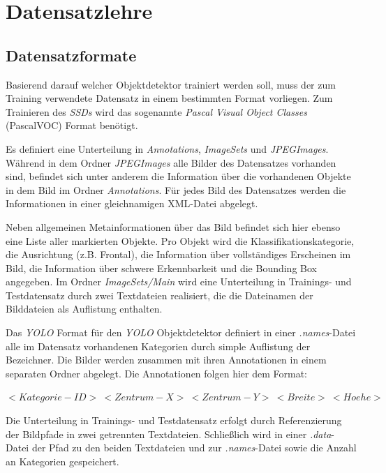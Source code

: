 \section{Datensatzlehre}

\subsection{Datensatzformate}

Basierend darauf welcher Objektdetektor trainiert werden soll, muss der zum Training verwendete Datensatz in einem bestimmten Format vorliegen. Zum Trainieren des \textit{SSDs} wird das sogenannte \textit{Pascal Visual Object Classes} (PascalVOC) Format benötigt. 

Es definiert eine Unterteilung in \textit{Annotations}, \textit{ImageSets} und \textit{JPEGImages}. Während in dem Ordner \textit{JPEGImages} alle Bilder des Datensatzes vorhanden sind, befindet sich unter anderem die Information über die vorhandenen Objekte in dem Bild im Ordner \textit{Annotations}. Für jedes Bild des Datensatzes werden die Informationen in einer gleichnamigen XML-Datei abgelegt. 

\lstset{language=XML}


Neben allgemeinen Metainformationen über das Bild befindet sich hier ebenso eine Liste aller markierten Objekte. Pro Objekt wird die Klassifikationskategorie, die Ausrichtung (z.B. \glqq Frontal\grqq{}), die Information über vollständiges Erscheinen im Bild, die Information über schwere Erkennbarkeit und die Bounding Box angegeben. Im Ordner \textit{ImageSets/Main} wird eine Unterteilung in Trainings- und Testdatensatz durch zwei Textdateien realisiert, die die Dateinamen der Bilddateien als Auflistung enthalten. \cite{RenuKhandelwal.2019}

Das \textit{YOLO} Format für den \textit{YOLO} Objektdetektor definiert in einer \textit{.names}-Datei alle im Datensatz vorhandenen Kategorien durch simple Auflistung der Bezeichner. Die Bilder werden zusammen mit ihren Annotationen in einem separaten Ordner abgelegt. Die Annotationen folgen hier dem Format:

$<Kategorie-ID>\:<Zentrum-X>\:<Zentrum-Y>\:<Breite>\:<Hoehe>$

Die Unterteilung in Trainings- und Testdatensatz erfolgt durch Referenzierung der Bildpfade in zwei getrennten Textdateien. Schließlich wird in einer \textit{.data}-Datei der Pfad zu den beiden Textdateien und zur \textit{.names}-Datei sowie die Anzahl an Kategorien gespeichert. \cite{ArunPonnusamy.20191006}

